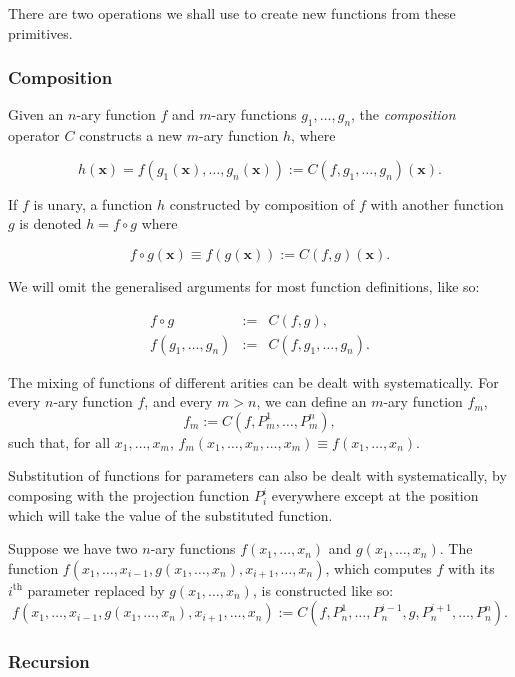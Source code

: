 \documentclass[a4paper]{article}
\newcommand{\xvec}{\mathbf{x}}	%
\theoremstyle{plain}
\theoremstyle{definition}
\begin{document}
There are two operations we shall use to create new functions from these primitives.

\subsubsection{Composition} 

Given an $n$-ary function $f$ and $m$-ary functions $g_1, \dots, g_n$, the {\it composition} operator $C$ constructs a new $m$-ary function $h$, where

\[ h(\xvec) = f(g_1(\xvec),\dots, g_n(\xvec)) := C(f,g_1, \dots, g_n)(\xvec). \]

If $f$ is unary, a function $h$ constructed by composition of $f$ with another function $g$ is denoted $h = f \circ g$ where

\[f \circ g(\xvec) \equiv f(g(\xvec)) := C(f,g)(\xvec).\] 

We will omit the generalised arguments for most function definitions, like so:

\begin{eqnarray*}
	f \circ g &:=& C(f,g), \\
	f(g_1, \dots, g_n) &:=& C(f,g_1, \dots, g_n).
\end{eqnarray*}

The mixing of functions of different arities can be dealt with systematically. For every $n$-ary function $f$, and every $m > n$, we can define an $m$-ary function $f_m$, 
\[f_m := C(f,P_m^1, \dots, P_m^n),\]
such that, for all $x_1, \dots, x_m$, $f_m(x_1, \dots, x_n, \dots, x_m) \equiv f(x_1, \dots, x_n)$.

Substitution of functions for parameters can also be dealt with systematically, by composing with the projection function $P_i^i$ everywhere except at the position which will take the value of the substituted function.

Suppose we have two $n$-ary functions $f(x_1,\dots,x_n)$ and $g(x_1,\dots,x_n)$. The function $f(x_1,\dots,x_{i-1},g(x_1,\dots,x_n),x_{i+1},\dots,x_n)$, which computes $f$ with its $i^{\textrm{th}}$ parameter replaced by $g(x_1,\dots,x_n)$, is constructed like so:
\[f(x_1,\dots,x_{i-1},g(x_1,\dots,x_n),x_{i+1},\dots,x_n) := C(f,P_n^1,\dots,P_n^{i-1},g,P_n^{i+1},\dots,P_n^n).\]



\subsubsection{Recursion}
\end{document}
